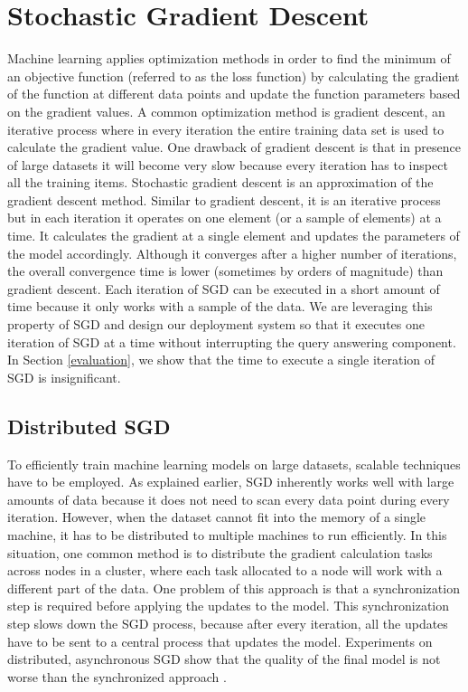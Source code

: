 \documentclass{vldb}
\begin{document}
\section{Stochastic Gradient Descent} \label{sgd}
Machine learning applies optimization methods in order to find the minimum of an objective function (referred to as the loss function) by calculating the gradient of the function at different data points and update the function parameters based on the gradient values.
A common optimization method is gradient descent, an iterative process where in every iteration the entire training data set is used to calculate the gradient value.
One drawback of gradient descent is that in presence of large datasets it will become very slow because every iteration has to inspect all the training items.
Stochastic gradient descent \cite{bottou2010large} is an approximation of the gradient descent method. 
Similar to gradient descent, it is an iterative process but in each iteration it operates on one element (or a sample of elements) at a time. 
It calculates the gradient at a single element and updates the parameters of the model accordingly. 
Although it converges after a higher number of iterations, the overall convergence time is lower (sometimes by orders of magnitude) than gradient descent. 
Each iteration of SGD can be executed in a short amount of time because it only works with a sample of the data.
We are leveraging this property of SGD and design our deployment system so that it executes one iteration of SGD at a time without interrupting the query answering component.
In Section \ref{evaluation}, we show that the time to execute a single iteration of SGD is insignificant.

\subsection{Distributed SGD}
To efficiently train machine learning models on large datasets, scalable techniques have to be employed.
As explained earlier, SGD inherently works well with large amounts of data because it does not need to scan every data point during every iteration.
However, when the dataset cannot fit into the memory of a single machine, it has to be distributed to multiple machines to run efficiently.
In this situation, one common method is to distribute the gradient calculation tasks across nodes in a cluster, where each task allocated to a node will work with a different part of the data.
One problem of this approach is that a synchronization step is required before applying the updates to the model. 
This synchronization step slows down the SGD process, because after every iteration, all the updates have to be sent to a central process that updates the model.
Experiments on distributed, asynchronous SGD show that the quality of the final model is not worse than the synchronized approach \cite{recht2011hogwild, dean2012large}. 
\end{document}
